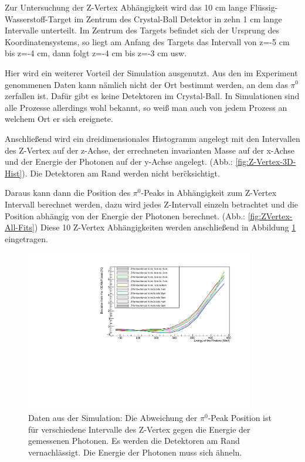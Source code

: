 \documentclass[a4paper,11pt,oneside,final,german,openbib,pdftex]{scrbook}
\begin{document}
{Zur Untersuchung der Z-Vertex Abhängigkeit wird das 10 cm lange Fl\"ussig-Wasserstoff-Target im Zentrum des Crystal-Ball Detektor in zehn 1 cm lange Intervalle unterteilt. 
Im Zentrum des Targets befindet sich der Ursprung des Koordinatensystems, so liegt am Anfang des Targets das Intervall von z=-5 cm bis z=-4 cm, dann folgt z=-4 cm bis z=-3 cm usw. 

Hier wird ein weiterer Vorteil der Simulation ausgenutzt. Aus den im Experiment genommenen Daten kann n\"amlich nicht der Ort bestimmt werden, an dem das $\pi^0$ zerfallen ist. Daf\"ur gibt es keine Detektoren im Crystal-Ball. In Simulationen sind alle Prozesse allerdings wohl bekannt, so wei{\ss} man auch von jedem Prozess an welchem Ort er sich ereignete. 

Anschließend wird ein dreidimensionales Histogramm angelegt mit den Intervallen des Z-Vertex auf der z-Achse, der errechneten invarianten Masse auf der x-Achse und der Energie der Photonen auf der y-Achse angelegt. (Abb.: \ref{fig:Z-Vertex-3D-Hist}). Die Detektoren am Rand werden nicht ber\"cksichtigt.

Daraus kann dann die Position des $\pi^0$-Peaks in Abhängigkeit zum Z-Vertex Intervall berechnet werden, dazu wird jedes Z-Intervall einzeln betrachtet und die Position abhängig von der Energie der Photonen berechnet. (Abb.: \ref{fig:ZVertex-All-Fits})
Diese 10 Z-Vertex Abhängigkeiten werden anschließend in Abbildung \ref{fig:Z-Vertex-Multi-Graph} eingetragen.

\begin{figure}[h!]
	\begin{center}
		\includegraphics[width=100mm]{NewCalib/20171904ZVertexMultigraph}
		\caption[Simulation: Symmetrische Photonen; Abweichung f\"ur verschiedene Z-Vertices]{Daten aus der Simulation: Die Abweichung der $\pi^0$-Peak Position ist für verschiedene Intervalle des Z-Vertex gegen die Energie der gemessenen Photonen. Es werden die Detektoren am Rand vernachl\"assigt. Die Energie der Photonen muss sich \"ahneln.}
		\label{fig:Z-Vertex-Multi-Graph}
	\end{center}
\end{figure}

}
\end{document}
